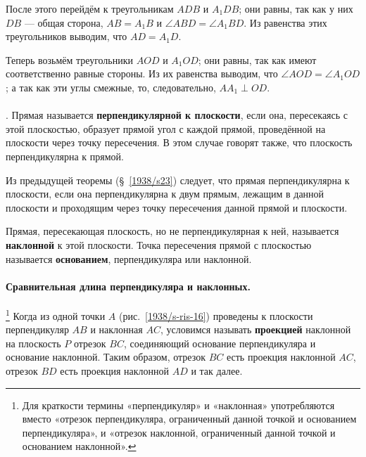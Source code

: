После этого перейдём к треугольникам $ADB$ и $A_1DB$;
они равны, так как у них $DB$ — общая сторона, $AB=A_1B$ и $\angle ABD=\angle A_1BD$.
Из равенства этих треугольников выводим, что $AD=A_1D$.

Теперь возьмём треугольники $AOD$ и $A_1OD$;
они равны, так как имеют соответственно равные стороны.
Из их равенства выводим, что $\angle AOD=\angle A_1OD$;
а так как эти углы смежные, то, следовательно, $AA_1\perp OD$.

\paragraph{}\label{1938/s24}
.
Прямая называется \textbf{перпендикулярной к плоскости}, если она, пересекаясь с этой плоскостью, образует прямой угол с каждой прямой, проведённой на плоскости через точку пересечения.
В этом случае говорят также, что плоскость перпендикулярна к прямой.

Из предыдущей теоремы (§~\ref{1938/s23}) следует, что прямая перпендикулярна к плоскости, если она перпендикулярна к двум прямым, лежащим в данной плоскости и проходящим через точку пересечения данной прямой и плоскости.

Прямая, пересекающая плоскость, но не перпендикулярная к ней, называется \textbf{наклонной} к этой плоскости.
Точка пересечения прямой с плоскостью называется \textbf{основанием}, перпендикуляра или наклонной.


\paragraph{Сравнительная длина перпендикуляра и наклонных.}\label{1938/s25}%
\footnote{Для краткости термины «перпендикуляр» и «наклонная» употребляются вместо «отрезок перпендикуляра, ограниченный данной точкой и основанием перпендикуляра», и «отрезок наклонной, ограниченный данной точкой и основанием наклонной».}
Когда из одной точки $A$ (рис.~\ref{1938/s-ris-16}) проведены к плоскости перпендикуляр $AB$ и наклонная $AC$, условимся называть \textbf{проекцией} наклонной на плоскость $P$ отрезок $BC$, соединяющий основание перпендикуляра и основание наклонной.
Таким образом, отрезок $BC$ есть проекция наклонной $AC$, отрезок $BD$ есть проекция наклонной $AD$ и так далее.

\medskip

